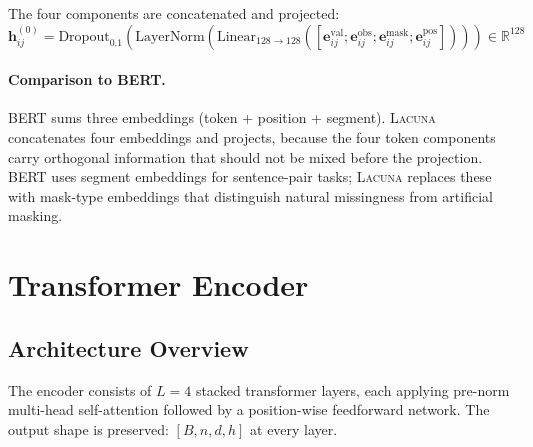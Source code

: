 \documentclass[11pt]{article}
\newcommand{\RR}{\mathbb{R}}
\newcommand{\layernorm}{\text{LayerNorm}}
\newcommand{\lacuna}{\textsc{Lacuna}}
\begin{document}
The four components are concatenated and projected:
\begin{equation}
\mathbf{h}^{(0)}_{ij} = \text{Dropout}_{0.1}\!\left(\layernorm\!\left(\text{Linear}_{128 \to 128}\!\left([\mathbf{e}^{\text{val}}_{ij}; \mathbf{e}^{\text{obs}}_{ij}; \mathbf{e}^{\text{mask}}_{ij}; \mathbf{e}^{\text{pos}}_{ij}]\right)\right)\right) \in \RR^{128}
\label{eq:token_embed}
\end{equation}

\paragraph{Comparison to BERT.} BERT sums three embeddings (token + position + segment). \lacuna{} concatenates four embeddings and projects, because the four token components carry orthogonal information that should not be mixed before the projection. BERT uses segment embeddings for sentence-pair tasks; \lacuna{} replaces these with mask-type embeddings that distinguish natural missingness from artificial masking.

\section{Transformer Encoder}
\label{sec:encoder}

\subsection{Architecture Overview}

The encoder consists of $L = 4$ stacked transformer layers, each applying pre-norm multi-head self-attention followed by a position-wise feedforward network. The output shape is preserved: $[B, n, d, h]$ at every layer.
\end{document}
